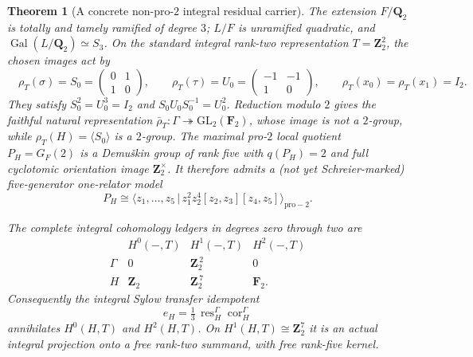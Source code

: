 \documentclass[11pt]{article}
\newtheorem{theorem}{Theorem}[section]
\theoremstyle{definition}
\begin{document}
\begin{theorem}[A concrete non-pro-$2$ integral residual carrier]
\label{thm:dyadic-s3-integral-sector}
The extension $F/\mathbf Q_2$ is totally
and tamely ramified of degree $3$;
$L/F$ is unramified quadratic, and
$\operatorname{Gal}(L/\mathbf Q_2)\simeq S_3$.
On the standard integral rank-two
representation $T=\mathbf Z_2^2$, the
chosen images act by
\begin{equation}\label{eq:dyadic-s3-integral-matrices}
\boxed{\quad
\rho_T(\sigma)=
S_0=\begin{pmatrix}0&1\\1&0\end{pmatrix},
\qquad
\rho_T(\tau)=
U_0=\begin{pmatrix}-1&-1\\1&0\end{pmatrix},
\qquad
\rho_T(x_0)=\rho_T(x_1)=I_2.
\quad}
\end{equation}
They satisfy $S_0^2=U_0^3=I_2$ and
$S_0U_0S_0^{-1}=U_0^2$.
Reduction modulo $2$ gives the faithful
natural representation
$\bar\rho_T:\Gamma\twoheadrightarrow
\mathrm{GL}_2(\mathbf F_2)$,
whose image is \emph{not} a $2$-group,
while $\rho_T(H)=\langle S_0\rangle$
is a $2$-group.
The maximal pro-$2$ local quotient
$P_H=G_F(2)$ is a Demu\v{s}kin group
of rank five with $q(P_H)=2$ and
full cyclotomic orientation image
$\mathbf Z_2^\times$.
It therefore admits a (not yet
Schreier-marked) five-generator
one-relator model
\begin{equation}\label{eq:dyadic-s3-h-demushkin-five-relator}
P_H\cong\bigl\langle z_1,\ldots,z_5
\,\big|\,
z_1^2z_2^4[z_2,z_3][z_4,z_5]
\bigr\rangle_{\mathrm{pro}-2}.
\end{equation}

The complete integral cohomology ledgers
in degrees zero through two are
\begin{equation}\label{eq:dyadic-s3-natural-cohom-ledger}
\boxed{
\begin{array}{c|ccc}
 &H^0(-,T)&H^1(-,T)&H^2(-,T)\\ \hline
 \Gamma&0&\mathbf Z_2^{\,2}&0\\
 H&\mathbf Z_2&\mathbf Z_2^{\,7}&\mathbf F_2 .
\end{array}}
\end{equation}
Consequently the integral Sylow transfer
idempotent
\begin{equation}\label{eq:dyadic-s3-sylow-idempotent}
e_H=\tfrac13\,\operatorname{res}_H^\Gamma
\operatorname{cor}_H^\Gamma
\end{equation}
annihilates $H^0(H,T)$ and $H^2(H,T)$.
On $H^1(H,T)\cong\mathbf Z_2^7$
it is an actual integral projection
onto a free rank-two summand, with
free rank-five kernel.
\end{theorem}
\end{document}
